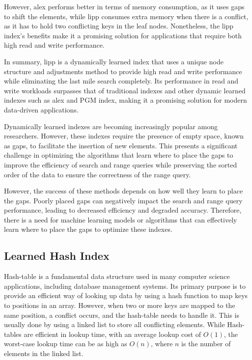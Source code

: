 However, \acrshort{alex} performs better in terms of memory consumption, as it uses gaps to shift the elements, while \acrshort{lipp} consumes extra memory when there is a conflict, as it has to hold two conflicting keys in the leaf nodes. Nonetheless, the \acrshort{lipp} index's benefits make it a promising solution for applications that require both high read and write performance.

In summary, \acrshort{lipp} is a dynamically learned index that uses a unique node structure and adjustments method to provide high read and write performance while eliminating the last mile search completely. Its performance in read and write workloads surpasses that of traditional indexes and other dynamic learned indexes such as \acrshort{alex} and PGM index, making it a promising solution for modern data-driven applications.

Dynamically learned indexes are becoming increasingly popular among researchers. However, these indexes require the presence of empty space, known as gaps, to facilitate the insertion of new elements. This presents a significant challenge in optimizing the algorithms that learn where to place the gaps to improve the efficiency of search and range queries while preserving the sorted order of the data to ensure the correctness of the range query.

However, the success of these methods depends on how well they learn to place the gaps. Poorly placed gaps can negatively impact the search and range query performance, leading to decreased efficiency and degraded accuracy. Therefore, there is a need for machine learning models or algorithms that can effectively learn where to place the gaps to optimize these indexes.


\subsection{Learned Hash Index}
Hash-table is a fundamental data structure used in many computer science applications, including database management systems. Its primary purpose is to provide an efficient way of looking up data by using a hash function to map keys to positions in an array. However, when two or more keys are mapped to the same position, a conflict occurs, and the hash-table needs to handle it. This is usually done by using a linked list to store all conflicting elements. While Hash-tables are efficient in lookup time, with an average lookup cost of $O(1)$, the worst-case lookup time can be as high as $O(n)$, where $n$ is the number of elements in the linked list.

